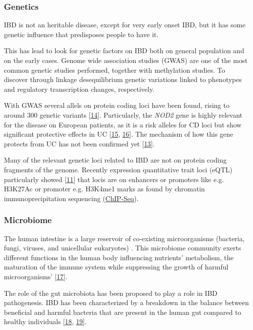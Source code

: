 \documentclass[
  12pt,
  a4paper,
  twoside,
  openright]{book}
\begin{document}
\hypertarget{genetics}{%
\subsubsection{Genetics}\label{genetics}}

IBD is not an heritable disease, except for very early onset IBD, but it has some genetic influence that predisposes people to have it.

This has lead to look for genetic factors on IBD both on general population and on the early cases.
Genome wide association studies (GWAS) are one of the most common genetic studies performed, together with methylation studies.
To discover through linkage desequilibrium genetic variations linked to phenotypes and regulatory transcription changes, respectively.

With GWAS several allels on protein coding loci have been found, rising to around 300 genetic variants {[}\protect\hyperlink{ref-kumar2019}{14}{]}.
Particularly, the \emph{NOD2} gene is highly relevant for the disease on European patients, as it is a risk alleles for CD loci but show significant protective effects in UC {[}\protect\hyperlink{ref-jostins2012}{15}, \protect\hyperlink{ref-momozawa2018}{16}{]}.
The mechanism of how this gene protects from UC has not been confirmed yet {[}\protect\hyperlink{ref-horowitz2021}{13}{]}.

Many of the relevant genetic loci related to IBD are not on protein coding fragments of the genome.
Recently expression quantitative trait loci (eQTL) particularly showed {[}\protect\hyperlink{ref-mcgovern2015}{11}{]} that locis are on enhancers or promoters like e.g.
H3K27Ac or promoter e.g.
H3K4me1 marks as found by chromatin immunoprecipitation sequencing (\href{https://en.wikipedia.org/wiki/ChIP_sequencing}{ChIP-Seq}).

\hypertarget{microbiome}{%
\subsubsection{Microbiome}\label{microbiome}}

The human intestine is a large reservoir of co-existing microorganisms (bacteria, fungi, viruses, and unicellular eukaryotes) .
This microbiome community exerts different functions in the human body influencing nutrients' metabolism, the maturation of the immune system while suppressing the growth of harmful microorganisms' {[}\protect\hyperlink{ref-khanna2014}{17}{]}.

The role of the gut microbiota has been proposed to play a role in IBD pathogenesis.
IBD has been characterized by a breakdown in the balance between beneficial and harmful bacteria that are present in the human gut compared to healthy individuals {[}\protect\hyperlink{ref-swidsinski2002}{18}, \protect\hyperlink{ref-tamboli2004}{19}{]}.
\end{document}
